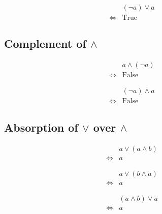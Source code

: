 \begin{prop}
\label{Proposition:lor_complement_2}
\begin{align*}
& (\lnot a) \lor a \\
\iff & \text{True}
\end{align*}
\end{prop}

\subsection{Complement of $\land$}
\begin{prop}
\label{Proposition:land_complement_1}
\begin{align*}
& a \land (\lnot a) \\
\iff & \text{False}
\end{align*}
\end{prop}

\begin{prop}
\label{Proposition:land_complement_2}
\begin{align*}
& (\lnot a) \land a \\
\iff & \text{False}
\end{align*}
\end{prop}

\subsection{Absorption of $\lor$ over $\land$}
\begin{prop}
\label{Proposition:lor_land_absorption_1}
\begin{align*}
& a \lor (a \land b) \\
\iff & a
\end{align*}
\end{prop}

\begin{prop}
\label{Proposition:lor_land_absorption_2}
\begin{align*}
& a \lor (b \land a) \\
\iff & a
\end{align*}
\end{prop}

\begin{prop}
\label{Proposition:lor_land_absorption_3}
\begin{align*}
& (a \land b) \lor a \\
\iff & a
\end{align*}
\end{prop}

